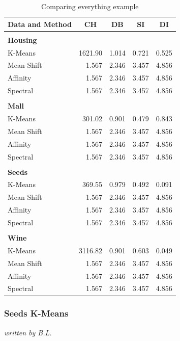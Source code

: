 \begin{table}[H]
\begin{center}
\begin{tabular}{lrrrr}
Data and Method & \multicolumn{1}{c}{\gls{CH}} & \multicolumn{1}{c}{\gls{DB}} & \multicolumn{1}{c}{\gls{SI}} & \multicolumn{1}{c}{\gls{DI}} \\ \hline
 &  &  &  &  \\
\textbf{Housing} &  &  &  & \\
K-Means & 1621.90 & 1.014 & 0.721 & 0.525 \\
Mean Shift & 1.567 & 2.346 & 3.457 & 4.856 \\
Affinity & 1.567 & 2.346 & 3.457 & 4.856 \\
Spectral & 1.567 & 2.346 & 3.457 & 4.856 \\
 &  &  &  &  \\
\textbf{Mall} &  &  &  &  \\
K-Means & 301.02 & 0.901 & 0.479 & 0.843 \\
Mean Shift & 1.567 & 2.346 & 3.457 & 4.856 \\
Affinity & 1.567 & 2.346 & 3.457 & 4.856 \\
Spectral & 1.567 & 2.346 & 3.457 & 4.856 \\
 &  &  &  &  \\
\textbf{Seeds} &  &  &  &  \\
K-Means & 369.55 & 0.979 & 0.492 & 0.091 \\
Mean Shift & 1.567 & 2.346 & 3.457 & 4.856 \\
Affinity & 1.567 & 2.346 & 3.457 & 4.856 \\
Spectral & 1.567 & 2.346 & 3.457 & 4.856 \\
 &  &  &  &  \\
\textbf{Wine} &  &  &  &  \\
K-Means & 3116.82 & 0.901 & 0.603 & 0.049 \\
Mean Shift & 1.567 & 2.346 & 3.457 & 4.856 \\
Affinity & 1.567 & 2.346 & 3.457 & 4.856 \\
Spectral & 1.567 & 2.346 & 3.457 & 4.856
\end{tabular}%
\end{center}
\caption{Comparing everything example}
\label{tab:evalutaion_table}
\end{table}


\subsubsection{Seeds K-Means}
\textit{written by B.L.}\\

